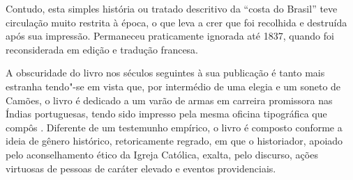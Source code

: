 \hspace*{-7cm}\hrulefill\hspace*{-7cm}

\medskip

\noindent{} Contudo, esta simples história ou tratado descritivo da “costa do Brasil” teve circulação muito restrita à época, o que leva a crer que foi recolhida e destruída após sua impressão. Permaneceu praticamente ignorada até 1837, quando foi reconsiderada em edição e tradução francesa.

A obscuridade do livro nos séculos seguintes à sua publicação é tanto mais estranha tendo"-se em vista que, por intermédio de uma elegia e um soneto de Camões, o livro é dedicado a um varão de armas em carreira promissora nas Índias portuguesas, tendo sido impresso pela mesma oficina tipográfica que compôs {}. Diferente de um testemunho empírico, o livro é composto conforme a ideia de gênero histórico, retoricamente regrado, em que o historiador, apoiado pelo aconselhamento ético da Igreja Católica, exalta, pelo discurso, ações virtuosas de pessoas de caráter elevado e eventos providenciais.

\vfill

\hspace*{-.4cm}\begin{minipage}[c]{.6\linewidth}
\small{
{}}
\end{minipage}

\pagebreak


